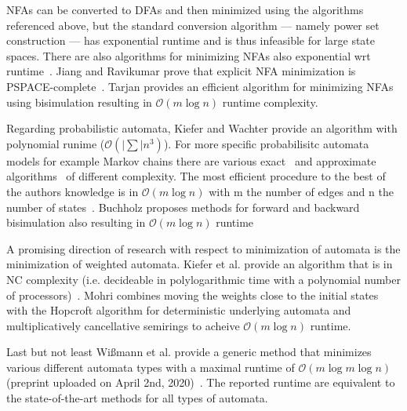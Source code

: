 \documentclass[11pt, rgb]{scrartcl}
\begin{document}
NFAs can be converted to DFAs and then minimized using the algorithms referenced above, but the standard conversion algorithm --- namely power set construction --- has exponential runtime and is thus infeasible for large state spaces. 
There are also algorithms for minimizing NFAs also exponential wrt runtime~\autocite{kameda}. 
Jiang and Ravikumar prove that explicit NFA minimization is PSPACE-complete~\autocite{jiang}. 
Tarjan provides an efficient algorithm for minimizing NFAs using bisimulation resulting in $\mathcal{O}(m \log n)$ runtime complexity.

Regarding probabilistic automata, Kiefer and Wachter provide an algorithm with polynomial runime ($\mathcal{O}(|\sum|n^3)$). 
For more specific probabilisitc automata models for example Markov chains there are various exact~\autocite{mc_agg_crn, buchholz, kate} and approximate algorithms~\autocite{geiger, bacci} of different complexity. 
The most efficient procedure to the best of the authors knowledge is in $\mathcal{O}(m \log n)$ with m the number of edges and n the number of states~\autocite{valmari, wissmann}. Buchholz proposes methods for forward and backward bisimulation also resulting in $\mathcal{O}(m \log n)$ runtime~\autocite{buchholz2008bisimulation}

A promising direction of research with respect to minimization of automata is the minimization of weighted automata. 
Kiefer et al. provide an algorithm that is in NC complexity (i.e. decideable in polylogarithmic time with a polynomial number of processors)~\autocite{Kiefer2013OnTC}. Mohri combines moving the weights close to the initial states with the Hopcroft algorithm for deterministic underlying automata and multiplicatively cancellative semirings to acheive $\mathcal{O}(m \log n)$ runtime. 

Last but not least Wißmann et al. provide a generic method that minimizes various different automata types with a maximal runtime of $\mathcal{O}(m \log m \log n)$ (preprint uploaded on April 2nd, 2020)~\autocite{wissmann}. The reported runtime are equivalent to the state-of-the-art methods for all types of automata.
\end{document}
